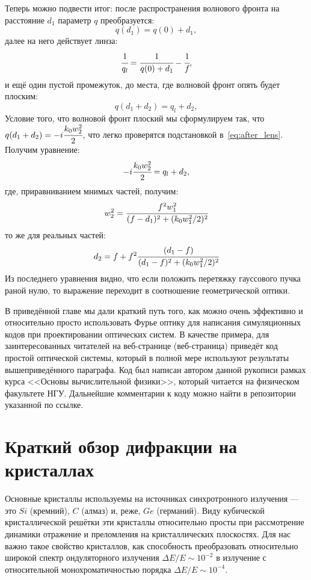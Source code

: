 Теперь можно подвести итог: после распространения волнового фронта на расстояние $d_1$ параметр $q$ преобразуется:
\begin{equation}
q(d_1) = q(0) + d_1, 
\end{equation}
далее на него действует линза: 
\begin{equation}
\cfrac{1}{q_l} = \cfrac{1}{q(0) + d_1} - \cfrac{1}{f},
\end{equation}
и ещё один пустой промежуток, до места, где волновой фронт опять будет плоским: 
\begin{equation}
q(d_1 + d_2) = q_l + d_2, 
\end{equation}
Условие того, что волновой фронт плоский мы сформулируем так, что $q(d_1 + d_2) = -i\cfrac{k_0w^2_2}{2}$, что легко проверятся подстановкой в~\ref{eq:after_lens}. Получим уравнение: 
\begin{equation}
-i\cfrac{k_0w^2_2}{2} = q_l + d_2, 
\end{equation}
где, приравниванием мнимых частей, получим: 
\begin{equation}
w^2_2 = \cfrac{f^2w^2_1}{(f - d_1)^2 + (k_0w^2_1/2)^2}
\end{equation}
то же для реальных частей: 
\begin{equation}
d_2 = f + f^2\cfrac{(d_1 - f)}{(d_1 - f)^2 + (k_0w^2_1/2)^2}
\end{equation}
Из последнего уравнения видно, что если положить перетяжку гауссового пучка раной нулю, то выражение переходит в соотношение геометрической оптики.

В приведённой главе мы дали краткий путь того, как можно очень эффективно и относительно просто использовать Фурье оптику для написания симуляционных кодов при проектировании оптических систем. В качестве примера, для заинтересованных читателей на веб-странице (веб-страница) приведёт код простой оптической системы, который в полной мере используют результаты вышеприведённого параграфа. Код был написан автором данной рукописи рамках курса <<Основы вычислительной физики>>, который читается на физическом факультете НГУ. Дальнейшие комментарии к коду можно найти в репозитории указанной по ссылке.
\fi

\chapter{Краткий обзор дифракции на кристаллах}
Основные кристаллы используемы на источниках синхротронного излучения --- это $Si$ (кремний), $C$ (алмаз) и, реже, $Ge$ (германий). Виду кубической кристаллической решётки эти кристаллы относительно просты при рассмотрение динамики отражение и преломления на кристаллических плоскостях. Для нас важно такое свойство кристаллов, как способность преобразовать относительно широкой спектр ондуляторного излучения $\Delta E/ E \sim 10^{-2}$ в излучение с относительной монохроматичностью порядка $\Delta E/ E \sim 10^{-4}$. 
